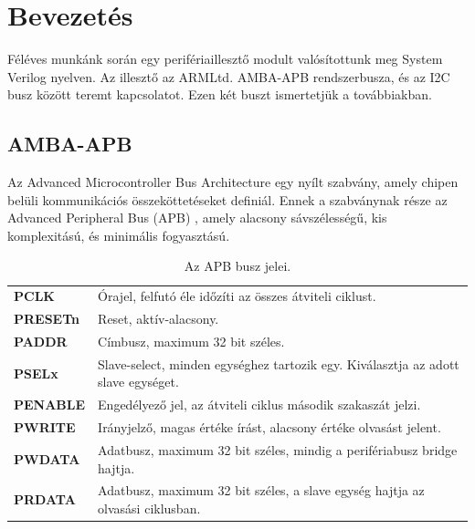 \chapter{Bevezetés}
\label{sec:intro}

Féléves munkánk során egy perifériaillesztő modult valósítottunk meg System Verilog nyelven. Az illesztő az ARM\texttrademark Ltd. AMBA\texttrademark-APB rendszerbusza, és az I2C busz között teremt kapcsolatot. Ezen két buszt ismertetjük a továbbiakban.

\section{AMBA-APB}{
    Az Advanced Microcontroller Bus Architecture egy nyílt szabvány, amely chipen belüli kommunikációs összeköttetéseket definiál. Ennek a szabványnak része az Advanced Peripheral Bus (APB)\cite{APB} , amely alacsony sávszélességű, kis komplexitású, és minimális fogyasztású.

    \begin{table}[ht!]
        \begin{tabular}{l|p{}}
            \textbf{PCLK}       & Órajel, felfutó éle időzíti az összes átviteli ciklust. \\[3ex]
            \textbf{PRESETn}    & Reset, aktív-alacsony. \\[3ex]
            \textbf{PADDR}      & Címbusz, maximum 32 bit széles. \\[3ex]
            \textbf{PSELx}      & Slave-select, minden egységhez tartozik egy. Kiválasztja az adott slave egységet. \\[3ex]
            \textbf{PENABLE}    & Engedélyező jel, az átviteli ciklus második szakaszát jelzi. \\[3ex]
            \textbf{PWRITE}     & Irányjelző, magas értéke írást, alacsony értéke olvasást jelent. \\[3ex]
            \textbf{PWDATA}     & Adatbusz, maximum 32 bit széles, mindig a perifériabusz bridge hajtja. \\[3ex]
            \textbf{PRDATA}     & Adatbusz, maximum 32 bit széles, a slave egység hajtja az olvasási ciklusban.
        \end{tabular}
        \caption{Az APB busz jelei.}
        \label{tab:APBsig}
    \end{table}

}
